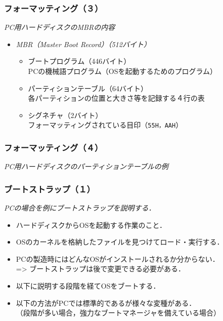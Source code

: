 \documentclass[unicode,handout]{beamer}                   %
\begin{document}
\begin{frame}
  \frametitle{フォーマッティング（３）}
  \emph{PC用ハードディスクのMBRの内容}
  \begin{itemize}
  \item \emph{MBR（Master Boot Record）（512バイト）} \\
    \begin{itemize}
    \item ブートプログラム（446バイト） \\
      PCの機械語プログラム（OSを起動するためのプログラム）
    \item パーティションテーブル（64バイト） \\
      各パーティションの位置と大きさ等を記録する４行の表 \\
    \item シグネチャ（2バイト） \\
      フォーマッティングされている目印（\texttt{55H，AAH}）
    \end{itemize}
  \end{itemize}
\end{frame}

\begin{frame}
  \frametitle{フォーマッティング（４）}
  \emph{PC用ハードディスクのパーティションテーブルの例}
  \begin{center}
    \begin{minipage}{0.64\columnwidth}
    \end{minipage}
    \begin{minipage}{0.34\columnwidth}
    \end{minipage}
  \end{center}
\end{frame}

\begin{frame}
  \frametitle{ブートストラップ（１）}
  \emph{PCの場合を例にブートストラップを説明する．}
  \begin{itemize}
  \item ハードディスクからOSを起動する作業のこと．
  \item OSのカーネルを格納したファイルを見つけてロード・実行する．
  \item PCの製造時にはどんなOSがインストールされるか分からない． \\
    => ブートストラップは後で変更できる必要がある．
  \item 以下に説明する段階を経てOSをブートする．
  \item 以下の方法がPCでは標準的であるが様々な変種がある．\\
    （段階が多い場合，強力なブートマネージャを備えている場合）
  \end{itemize}
\end{frame}
\end{document}
